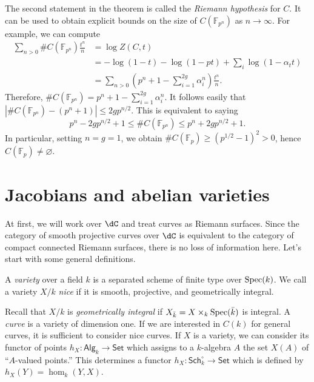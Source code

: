 \documentclass{article}
\begin{document}
The second statement in the theorem is called the \emph{Riemann hypothesis} 
for $C$. It can be used to obtain explicit bounds on the size of 
$C(\mathbb{F}_{p^n})$ as $n\to\infty$. For example, we can compute 
\begin{align*}
  \sum_{n>0} \# C(\mathbb{F}_{p^n}) \frac{t^n}{n} 
    &= \log Z(C,t) \\
    &= -\log(1-t) - \log(1-p t) + \sum_i \log(1-\alpha_t t) \\
    &= \sum_{n>0} \left(p^n+1-\sum_{i=1}^{2 g} \alpha_i^n\right) \frac{t^n}{n} \text{.}
\end{align*}
Therefore, $\# C(\mathbb{F}_{p^n}) = p^n+1-\sum_{i=1}^{2 g} \alpha_i^n$. It 
follows easily that $|\# C(\mathbb{F}_{p^n})-(p^n+1)| \leqslant 2 g p^{n/2}$. 
This is equivalent to saying 
\[
  p^n-2 g p^{n/2}+1 
    \leqslant \# C(\mathbb{F}_{p^n}) 
    \leqslant p^n + 2 g p^{n/2} + 1 \text{.}
\]
In particular, setting $n = g = 1$, we obtain 
$\# C(\mathbb{F}_p) \geqslant (p^{1/2}-1)^2>0$, hence 
$C(\mathbb{F}_p)\ne\varnothing$. 











\section{Jacobians and abelian varieties}


At first, we will work over $\dC$ and treat curves as Riemann surfaces. Since 
the category of smooth projective curves over $\dC$ is equivalent to the 
category of compact connected Riemann surfaces, there is no loss of 
information here. Let's start with some general definitions.

\begin{definition}
A \emph{variety} over a field $k$ is a separated scheme of finite type over 
$\operatorname{Spec}(k)$. We call a variety $X/k$ \emph{nice} if it is smooth, projective, 
and geometrically integral.
\end{definition}

Recall that $X/k$ is \emph{geometrically integral} if 
$X_{\bar k}=X\times_k \operatorname{Spec}(\bar k)$ is integral. A \emph{curve} is a 
variety of dimension one. If we are interested in $C(k)$ for general curves, 
it is sufficient to consider nice curves. If $X$ is a variety, we can consider 
its functor of points $h_X:\mathsf{Alg}_k\to \mathsf{Set}$ which assigns to a 
$k$-algebra $A$ the set $X(A)$ of ``$A$-valued points.'' This determines a 
functor $h_X:\mathsf{Sch}_k^\circ\to\mathsf{Set}$ which is defined by 
$h_X(Y)=\hom_k(Y,X)$. 
\end{document}
